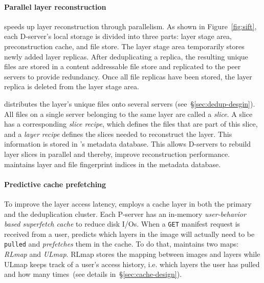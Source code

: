 \paragraph{Parallel layer reconstruction}
%
\sysname speeds up layer reconstruction through parallelism.
%
As shown in Figure~\ref{fig:sift}, each D-server's local storage is divided
into three parts: layer stage area, preconstruction cache, and file store.
%
The layer stage area temporarily stores newly added layer replicas.
%
After deduplicating a replica, the resulting unique files are stored in a
content addressable file store and replicated to the peer servers to provide
redundancy. Once all file replicas have been stored, the layer replica is deleted
from the layer stage area.%
%

\sysname distributes the layer's unique files onto several servers
(see~\S\ref{sec:dedup-desgin}).
%
All files on a single server belonging to the same layer are called a
\emph{slice}.
%
A slice has a corresponding \emph{slice recipe}, which defines the files that
are part of this slice, and a \emph{layer recipe} defines the slices needed to
reconstruct the layer.
%
This information is stored in \sysname{}'s metadata database.
%
This allows D-servers to rebuild layer slices in parallel and thereby, improve
reconstruction performance.
%
\sysname maintains layer and file fingerprint indices in the
metadata database.




\paragraph{Predictive cache prefetching}
%
To improve the layer access latency, \sysname employs a cache layer in both the
primary and the deduplication cluster.
%
Each P-server has an in-memory \emph{user-behavior based superfetch cache} to
reduce disk I/Os.
%
When a \texttt{GET} manifest request is received from a user, \sysname
predicts which layers in the image will actually need to be \texttt{pulled} and
\emph{prefetches} them in the cache.
%
To do that, \sysname maintains two maps: \emph{RLmap} and \emph{ULmap}.
%
RLmap stores the mapping between images and layers while ULmap keeps track of a
user's access history, i.e. which layers the user has pulled and how many
times~(see details in~\S\ref{sec:cache-design}).

